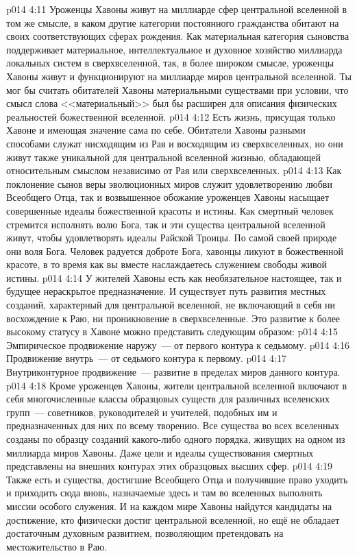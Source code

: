 \vs p014 4:11 Уроженцы Хавоны живут на миллиарде сфер центральной вселенной в том же смысле, в каком другие категории постоянного гражданства обитают на своих соответствующих сферах рождения. Как материальная категория сыновства поддерживает материальное, интеллектуальное и духовное хозяйство миллиарда локальных систем в сверхвселенной, так, в более широком смысле, уроженцы Хавоны живут и функционируют на миллиарде миров центральной вселенной. Ты мог бы считать обитателей Хавоны материальными существами при условии, что смысл слова <<материальный>> был бы расширен для описания физических реальностей божественной вселенной.
\vs p014 4:12 Есть жизнь, присущая только Хавоне и имеющая значение сама по себе. Обитатели Хавоны разными способами служат нисходящим из Рая и восходящим из сверхвселенных, но они живут также уникальной для центральной вселенной жизнью, обладающей относительным смыслом независимо от Рая или сверхвселенных.
\vs p014 4:13 Как поклонение сынов веры эволюционных миров служит удовлетворению любви Всеобщего Отца, так и возвышенное обожание уроженцев Хавоны насыщает совершенные идеалы божественной красоты и истины. Как смертный человек стремится исполнять волю Бога, так и эти существа центральной вселенной живут, чтобы удовлетворять идеалы Райской Троицы. По самой своей природе они  воля Бога. Человек радуется доброте Бога, хавонцы ликуют в божественной красоте, в то время как вы вместе наслаждаетесь служением свободы живой истины.
\vs p014 4:14 У жителей Хавоны есть как необязательное настоящее, так и будущее нераскрытое предназначение. И существует путь развития местных созданий, характерный для центральной вселенной, не включающий в себя ни восхождение к Раю, ни проникновение в сверхвселенные. Это развитие к более высокому статусу в Хавоне можно представить следующим образом:
\vs p014 4:15 Эмпирическое продвижение наружу~--- от первого контура к седьмому.
\vs p014 4:16 Продвижение внутрь~--- от седьмого контура к первому.
\vs p014 4:17 Внутриконтурное продвижение~--- развитие в пределах миров данного контура.
\vs p014 4:18 \pc Кроме уроженцев Хавоны, жители центральной вселенной включают в себя многочисленные классы образцовых существ для различных вселенских групп~--- советников, руководителей и учителей, подобных им и предназначенных для них по всему творению. Все существа во всех вселенных созданы по образцу созданий какого\hyp{}либо одного порядка, живущих на одном из миллиарда миров Хавоны. Даже цели и идеалы существования смертных представлены на внешних контурах этих образцовых высших сфер.
\vs p014 4:19 Также есть и существа, достигшие Всеобщего Отца и получившие право уходить и приходить сюда вновь, назначаемые здесь и там во вселенных выполнять миссии особого служения. И на каждом мире Хавоны найдутся кандидаты на достижение, кто физически достиг центральной вселенной, но ещё не обладает достаточным духовным развитием, позволяющим претендовать на местожительство в Раю.
